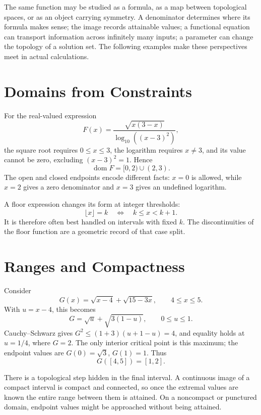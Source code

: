 
The same function may be studied as a formula, as a map between topological spaces, or as an object carrying symmetry. A denominator determines where its formula makes sense; the image records attainable values; a functional equation can transport information across infinitely many inputs; a parameter can change the topology of a solution set. The following examples make these perspectives meet in actual calculations.

\section{Domains from Constraints}

For the real-valued expression
\[
 F(x)=\frac{\sqrt{x(3-x)}}{\log_{10}((x-3)^2)},
\]
the square root requires \(0\le x\le3\), the logarithm requires \(x\ne3\), and its value cannot be zero, excluding \((x-3)^2=1\). Hence
\[
 \operatorname{dom}F=[0,2)\cup(2,3).
\]
The open and closed endpoints encode different facts: \(x=0\) is allowed, while \(x=2\) gives a zero denominator and \(x=3\) gives an undefined logarithm.

A floor expression changes its form at integer thresholds:
\[
 \lfloor x\rfloor=k\quad\Longleftrightarrow\quad k\le x<k+1.
\]
It is therefore often best handled on intervals with fixed \(k\). The discontinuities of the floor function are a geometric record of that case split.

\section{Ranges and Compactness}

Consider
\[
 G(x)=\sqrt{x-4}+\sqrt{15-3x},\qquad 4\le x\le5.
\]
With \(u=x-4\), this becomes
\[
 G=\sqrt u+\sqrt{3(1-u)},\qquad 0\le u\le1.
\]
Cauchy--Schwarz gives \(G^2\le(1+3)(u+1-u)=4\), and equality holds at \(u=1/4\), where \(G=2\). The only interior critical point is this maximum; the endpoint values are \(G(0)=\sqrt3\), \(G(1)=1\). Thus
\[
 \boxed{G([4,5])=[1,2].}
\]

There is a topological step hidden in the final interval. A continuous image of a compact interval is compact and connected, so once the extremal values are known the entire range between them is attained. On a noncompact or punctured domain, endpoint values might be approached without being attained.

